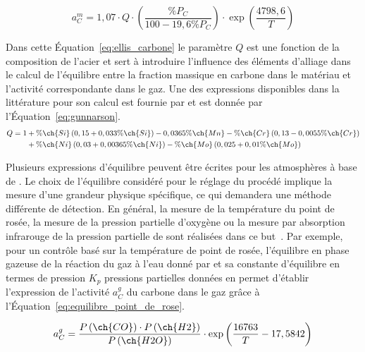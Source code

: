 \begin{equation}
  a_{C}^{m}=1,07\cdotp Q\cdotp\left(\frac{\si{\%}P_{C}}{100-19,6\si{\%}P_{C}}\right)
    \cdotp\exp\left(\frac{4798,6}{T}\right)
  \label{eq:ellis_carbone}
\end{equation}

Dans cette Équation~\ref{eq:ellis_carbone} le paramètre $Q$ est une fonction de la composition de l'acier et sert à introduire l'influence des éléments d'alliage dans le calcul de l'équilibre entre la fraction massique en carbone dans le matériau et l'activité correspondante dans le gaz. Une des expressions disponibles dans la littérature pour son calcul est fournie par \citet{Gunnarson1967} et est donnée par l'Équation~\ref{eq:gunnarson}.
\begin{equation}
  \begin{split}
  Q=1 & +\si{\%}\ch{Si}\left(0,15+0,033\si{\%}\ch{Si}\right)-0,0365\si{\%}\ch{Mn}
        -\si{\%}\ch{Cr}\left(0,13-0,0055\si{\%}\ch{Cr}\right)\\
      & +\si{\%}\ch{Ni}\left(0,03+0,00365\si{\%}\ch{Ni}\right)
        -\si{\%}\ch{Mo}\left(0,025+0,01\si{\%}\ch{Mo}\right)
  \end{split}
  \label{eq:gunnarson}
\end{equation}

Plusieurs expressions d'équilibre peuvent être écrites pour les atmosphères à base de . Le choix de l'équilibre considéré pour le réglage du procédé implique la mesure d'une grandeur physique spécifique, ce qui demandera une méthode différente de détection. En général, la mesure de la température du point de rosée, la mesure de la pression partielle d'oxygène ou la mesure par absorption infrarouge de la pression partielle de  sont réalisées dans ce but~\cite{Dulcy2007}. Par exemple, pour un contrôle basé sur la température de point de rosée, l'équilibre en phase gazeuse de la réaction du gaz à l'eau donné par  et sa constante d'équilibre en termes de pression $K_{p}$ \textendash{} pressions partielles données en \si{\atm} \textendash{} permet d'établir l'expression de l'activité $a_{C}^{g}$ du carbone dans le gaz grâce à l'Équation~\ref{eq:equilibre_point_de_rose}. 

\begin{equation}
  a_{C}^{g}=
  \frac{P\left(\ch{CO}\right)\cdot P\left(\ch{H2}\right)}
  {P\left(\ch{H2O}\right)}\cdot
  \exp\left(\frac{16763}{T}-17,5842\right)
  \label{eq:equilibre_point_de_rose}
\end{equation}

